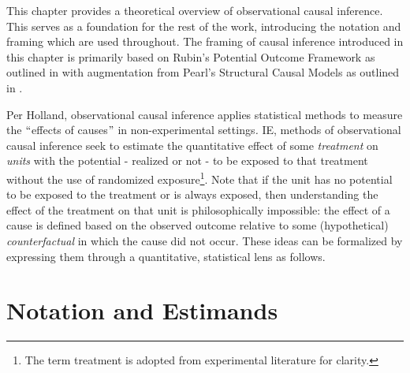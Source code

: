 \documentclass[../main.tex]{subfiles}
\begin{document}
This chapter provides a theoretical overview of observational causal inference. This serves as a foundation for the rest of the work, introducing the notation and framing which are used throughout. The framing of causal inference introduced in this chapter is primarily based on Rubin’s Potential Outcome Framework as outlined in \citet{Holland1986StatisticsInference} with augmentation from Pearl’s Structural Causal Models as outlined in \citet{Pearl2009CausalOverview}.\par

\vspace{\baselineskip}
Per Holland, observational causal inference applies statistical methods to measure the $``$effects of causes\textit{$"$  }in non-experimental settings\textit{. }IE, methods of observational causal inference seek to estimate the quantitative effect of some \textit{treatment }on \textit{units} with the potential - realized or not - to be exposed to that treatment without the use of randomized exposure\footnote{ The term treatment is adopted from experimental literature for clarity. }. Note that if the unit has no potential to be exposed to the treatment or is always exposed, then understanding the effect of the treatment on that unit is philosophically impossible: the effect of a cause is defined based on the observed outcome relative to some (hypothetical) \textit{counterfactual }in which the cause did not occur. These ideas can be formalized by expressing them through a quantitative, statistical lens as follows.\par

\section{Notation and Estimands}
\end{document}
